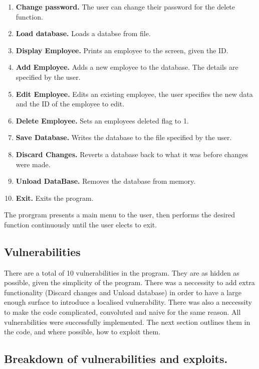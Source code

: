 \documentclass[]{article}
\begin{document}
\begin{enumerate}
	\item \textbf{Change password.} The user can change their password for the delete function.
	\item \textbf{Load database.} Loads a databse from file.
	\item \textbf{Display Employee.} Prints an employee to the screen, given the ID.
	\item \textbf{Add Employee.} Adds a new employee to the database. The details are specified by the user.
	\item \textbf{Edit Employee.} Edits an existing employee, the user specifies the new data and the ID of the employee to edit.
	\item \textbf{Delete Employee.} Sets an employees deleted flag to 1.
	\item \textbf{Save Database.} Writes the database to the file specified by the user.
	\item \textbf{Discard Changes.} Reverts a database back to what it was before changes were made.
	\item \textbf{Unload DataBase.} Removes the database from memory.
	\item \textbf{Exit.} Exits the program.
\end{enumerate}

The prorgram presents a main menu to the user, then performs the desired function continuously until the user elects to exit.

\subsection*{Vulnerabilities}
There are a total of 10 vulnerabilities in the program. They are as hidden as possible, given the simplicity of the program. There was a neccessity to add extra functionality (Discard changes and Unload database) in order to have a large enough surface to introduce a localised vulnerability. There was also a neccessity to make the code complicated, convoluted and naive for the same reason. All vulnerabilities were successfully implemented. The next section outlines them in the code, and where possible, how to exploit them.
\pagebreak

\begin{center}
	\section*{Breakdown of vulnerabilities and exploits.}
	\end{center}
\end{document}
